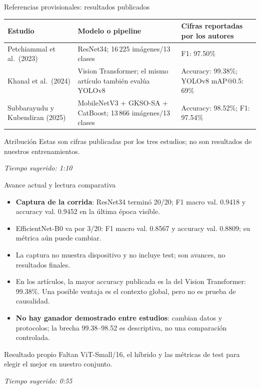 \documentclass[aspectratio=169,11pt]{beamer}
\newcommand{\tiempo}[1]{\vfill\hfill\scriptsize\textit{Tiempo sugerido: #1}}
\begin{document}
\begin{frame}{Referencias provisionales: resultados publicados}
    \small
    \begin{tabularx}{\textwidth}{p{3.1cm}p{4.0cm}Y}
            \toprule
            Estudio & Modelo o pipeline & Cifras reportadas por los autores \\
            \midrule
            Petchiammal et al.\ (2023) & ResNet34; 16\,225 imágenes/13 clases & F1: 97.50\% \\
            Khanal et al.\ (2024) & Vision Transformer; el mismo artículo también evalúa YOLOv8 & Accuracy: 99.38\%; YOLOv8 mAP@0.5: 69\% \\
            Subbarayudu y Kubendiran (2025) & MobileNetV3 + GKSO-SA + CatBoost; 13\,866 imágenes/13 clases & Accuracy: 98.52\%; F1: 97.54\% \\
            \bottomrule
    \end{tabularx}
    \begin{alertblock}{Atribución}
        Estas son cifras publicadas por los tres estudios; no son resultados de nuestros entrenamientos.
    \end{alertblock}
    \tiempo{1:10}
\end{frame}

\begin{frame}{Avance actual y lectura comparativa}
    \begin{itemize}
        \item \textbf{Captura de la corrida}: ResNet34 terminó 20/20; F1 macro val. 0.9418 y accuracy val. 0.9452 en la última época visible.
        \item EfficientNet-B0 va por 3/20: F1 macro val. 0.8567 y accuracy val. 0.8809; su métrica aún puede cambiar.
        \item La captura no muestra dispositivo y no incluye test; son avances, no resultados finales.
        \item En los artículos, la mayor accuracy publicada es la del Vision Transformer: 99.38\%. Una posible ventaja es el contexto global, pero no es prueba de causalidad.
        \item \textbf{No hay ganador demostrado entre estudios}: cambian datos y protocolos; la brecha 99.38--98.52 es descriptiva, no una comparación controlada.
    \end{itemize}
    \begin{block}{Resultado propio}
        Faltan ViT-Small/16, el híbrido y las métricas de test para elegir el mejor en nuestro conjunto.
    \end{block}
    \tiempo{0:55}
\end{frame}
\end{document}
